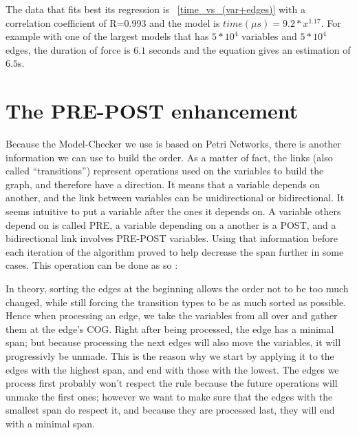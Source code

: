 \documentclass[12pt]{report}
\begin{document}
The data that fits best its regression is ~\ref{time_vs_(var+edges)} with a correlation coefficient of R=0.993 and the model is $time({\mu}s)= {9.2}*x^{1.17}$. For example with one of the largest models that has $5*10^4$ variables and $5*10^4$ edges, the duration of force is $6.1$ seconds and the equation gives an estimation of $6.5$s.

\section{The PRE-POST enhancement}

Because the Model-Checker we use is based on Petri Networks, there is another information we can use to build the order. As a matter of fact, the links (also called \enquote{transitions}) represent operations used on the variables to build the graph, and therefore have a direction. It means that a variable depends on another, and the link between variables can be unidirectional or bidirectional. It seems intuitive to put a variable after the ones it depends on. A variable others depend on is called PRE, a variable depending on a another is a POST, and a bidirectional link involves PRE-POST variables. Using that information before each iteration of the algorithm proved to help decrease the span further in some cases.
This operation can be done as so :

\begin{algorithm}
\begin{algorithmic}[1]
  \EndFor
\EndFunction
\end{algorithmic}
\end{algorithm}

In theory, sorting the edges at the beginning allows the order not to be too much changed, while still forcing the transition types to be as much sorted as possible. Hence when processing an edge, we take the variables from all over and gather them at the edge's COG. Right after being processed, the edge has a minimal span; but because processing the next edges will also move the variables, it will progressivly be unmade. This is the reason why we start by applying it to the edges with the highest span, and end with those with the lowest. The edges we process first probably won't respect the rule because the future operations will unmake the first ones; however we want to make sure that the edges with the smallest span do respect it, and because they are processed last, they will end with a minimal span.
\end{document}
